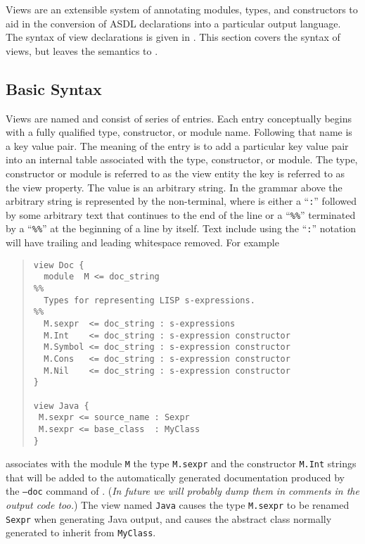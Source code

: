 Views are an extensible system of annotating modules, types, and
constructors to aid in the conversion of ASDL declarations into a
particular output language.
The syntax of view declarations is given in .
This section covers the syntax of views, but leaves the semantics to
.

\subsection{Basic Syntax}
Views are named and consist of series of entries.
Each entry conceptually
begins with a fully qualified type, constructor, or module name. Following
that name is a key value pair.
The meaning of the entry is to add a
particular key value pair into an internal table associated with the type,
constructor, or module.
The type, constructor or module is referred to as
the view entity the key is referred to as the view property.
The value is an arbitrary string.
In the grammar above the arbitrary string is represented
by the  non-terminal, where  is either a ``\lstinline!:!''
followed by some arbitrary text that continues to the end of the line or a
``\lstinline!%%!'' terminated by a ``\lstinline!%%!'' at the beginning of a line by itself. 
Text include using the ``\lstinline!:!'' notation will have trailing and leading 
whitespace removed. For example
%
\begin{quote}\begin{lstlisting}[language=ASDL]
view Doc {
  module  M <= doc_string
%%
  Types for representing LISP s-expressions.
%%
  M.sexpr  <= doc_string : s-expressions 
  M.Int    <= doc_string : s-expression constructor
  M.Symbol <= doc_string : s-expression constructor
  M.Cons   <= doc_string : s-expression constructor
  M.Nil    <= doc_string : s-expression constructor
}

view Java {
 M.sexpr <= source_name : Sexpr
 M.sexpr <= base_class  : MyClass
}
\end{lstlisting}\end{quote}%
%
associates with the module \lstinline[language=ASDL]!M! the type
\lstinline[language=ASDL]!M.sexpr! and the
constructor \lstinline[language=ASDL]!M.Int!
strings that will be added to the automatically generated documentation
produced by the \texttt{--doc} command of \asdlgen{}.
(\emph{In future we will probably dump them in comments in the output code too.})
The view named \lstinline[language=ASDL]!Java! causes the type
\lstinline[language=ASDL]!M.sexpr! to be renamed \lstinline[language=ASDL]!Sexpr! when
generating Java output, and causes the abstract class normally generated to
inherit from \lstinline[language=ASDL]!MyClass!. 

